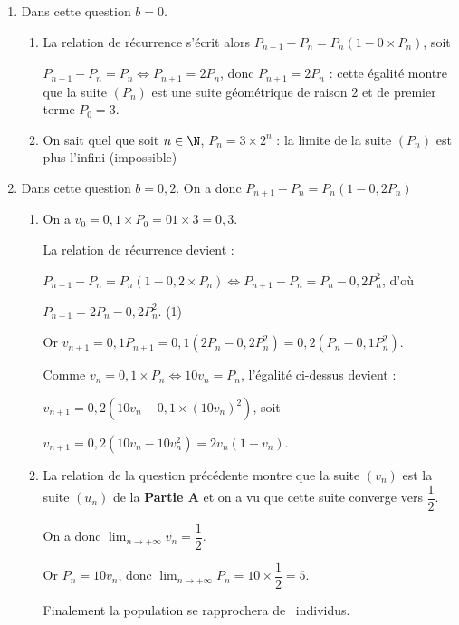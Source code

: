 \begin{enumerate}
\item Dans cette question $b  = 0$.
	\begin{enumerate}
		\item 
		La relation de récurrence s'écrit alors $P_{n+1} - P_n = P_n\left(1 - 0 \times P_n\right)$, soit 

$P_{n+1} - P_n = P_n \iff P_{n+1}  = 2 P_n$, donc $P_{n+1} = 2 P_n$ : cette égalité montre que la suite $\left(P_n\right)$ est une suite géométrique de raison $2$ et de premier terme $P_0 = 3$.
		\item 
On sait quel que soit $n \in \N$, \: $P_n = 3 \times 2^n$ : la limite de la suite $\left(P_n\right)$ est plus l'infini (impossible)
	\end{enumerate}
\item Dans cette question $b = 0,2$. On a donc $P_{n+1} - P_n = P_n\left(1 - 0,2P_n\right)$
	\begin{enumerate}
		\item 


On a $v_0 = 0,1 \times P_0 = 01 \times 3 = 0,3$.

La relation de récurrence devient :

$P_{n+1} -  P_n = P_n\left(1 -  0,2 \times P_n\right) \iff P_{n+1} -  P_n = P_n - 0,2P_n^2$, d'où

$P_{n+1} = 2P_n - 0,2P_n^2$. \: (1)

Or $v_{n+1} = 0,1P_{n+1} = 0,1\left(2P_n - 0,2P_n^2\right) = 0,2\left(P_n - 0,1P_n^2\right)$.

Comme $v_n = 0,1 \times P_n \iff 10v_n = P_n$, l'égalité ci-dessus devient :

$v_{n+1} = 0,2\left(10v_n - 0,1 \times \left(10v_n\right)^2\right)$, soit 

$v_{n+1} = 0,2\left(10v_n - 10v_n^2\right) = 2v_n \left(1 - v_n\right)$.
		\item 
La relation de la question précédente montre que la suite $\left(v_n \right)$ est la suite $\left(u_n \right)$ de la \textbf{Partie A} et on a vu que cette suite converge vers $\dfrac12$.

On a donc $\displaystyle\lim_{n \to + \infty} v_n = \dfrac12$.

Or $P_n = 10v_n$, donc $\displaystyle\lim_{n \to + \infty}P_n = 10 \times \dfrac12 = 5$.

Finalement la population se rapprochera de ~individus.
	\end{enumerate}
\end{enumerate}
